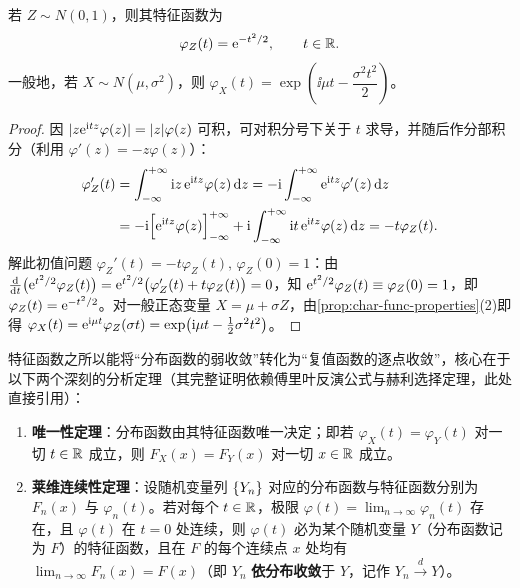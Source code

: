 \begin{proposition}[标准正态分布的特征函数]
\label{prop:normal-cf}
若 $Z\sim N(0,1)$，则其特征函数为
\begin{equation}
  \varphi_Z(t)=\mathrm{e}^{-t^2/2},\qquad t\in\mathbb{R}.
  \label{eq:std-normal-cf}
\end{equation}
一般地，若 $X\sim N(\mu,\sigma^2)$，则 $\varphi_X(t)=\exp\!\left(\ii\mu t-\dfrac{\sigma^2 t^2}{2}\right)$。
\end{proposition}
\begin{proof}
因 $\lvert z\mathrm{e}^{\mathrm{i} tz}\varphi(z)\rvert=\lvert z\rvert\varphi(z)$ 可积，可对积分号下关于 $t$ 求导，并随后作分部积分（利用 $\varphi'(z)=-z\varphi(z)$）：
\[
\begin{aligned}
  \varphi_Z'(t)&=\int_{-\infty}^{+\infty}\mathrm{i} z\,\mathrm{e}^{\mathrm{i} tz}\varphi(z)\mathop{}\!\mathrm{d} z
  =-\mathrm{i}\int_{-\infty}^{+\infty}\mathrm{e}^{\mathrm{i} tz}\varphi'(z)\mathop{}\!\mathrm{d} z\\
  &=-\mathrm{i}\Bigl[\mathrm{e}^{\mathrm{i} tz}\varphi(z)\Bigr]_{-\infty}^{+\infty}
   +\mathrm{i}\int_{-\infty}^{+\infty}\mathrm{i} t\,\mathrm{e}^{\mathrm{i} tz}\varphi(z)\mathop{}\!\mathrm{d} z
  =-t\varphi_Z(t).
\end{aligned}
\]
解此初值问题 $\varphi_Z'(t)=-t\varphi_Z(t),\,\varphi_Z(0)=1$：由 $\frac{\mathop{}\!\mathrm{d}}{\mathop{}\!\mathrm{d} t}\bigl(\mathrm{e}^{t^2/2}\varphi_Z(t)\bigr)=\mathrm{e}^{t^2/2}\bigl(\varphi_Z'(t)+t\varphi_Z(t)\bigr)=0$，知 $\mathrm{e}^{t^2/2}\varphi_Z(t)\equiv\varphi_Z(0)=1$，即 $\varphi_Z(t)=\mathrm{e}^{-t^2/2}$。对一般正态变量 $X=\mu+\sigma Z$，由\cref{prop:char-func-properties}(2)即得 $\varphi_X(t)=\mathrm{e}^{\mathrm{i}\mu t}\varphi_Z(\sigma t)=\exp\!\left(\mathrm{i}\mu t-\frac{1}{2}\sigma^2 t^2\right)$。
\end{proof}

特征函数之所以能将“分布函数的弱收敛”转化为“复值函数的逐点收敛”，核心在于以下两个深刻的分析定理（其完整证明依赖傅里叶反演公式与赫利选择定理，此处直接引用）：

\begin{theorem}
\label{thm:levy-continuity}
\begin{enumerate}
  \item \textbf{唯一性定理}：分布函数由其特征函数唯一决定；即若 $\varphi_X(t)=\varphi_Y(t)$ 对一切 $t\in\mathbb{R}$ 成立，则 $F_X(x)=F_Y(x)$ 对一切 $x\in\mathbb{R}$ 成立。
  \item \textbf{莱维连续性定理}：设随机变量列 $\{Y_n\}$ 对应的分布函数与特征函数分别为 $F_n(x)$ 与 $\varphi_n(t)$。若对每个 $t\in\mathbb{R}$，极限 $\varphi(t)=\lim_{n\to\infty}\varphi_n(t)$ 存在，且 $\varphi(t)$ 在 $t=0$ 处连续，则 $\varphi(t)$ 必为某个随机变量 $Y$（分布函数记为 $F$）的特征函数，且在 $F$ 的每个连续点 $x$ 处均有 $\lim_{n\to\infty}F_n(x)=F(x)$（即 $Y_n$ \textbf{依分布收敛}于 $Y$，记作 $Y_n\xrightarrow{d} Y$）。
\end{enumerate}
\end{theorem}

